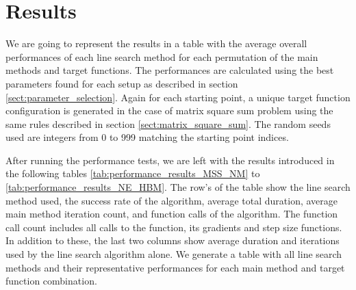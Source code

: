 \documentclass[a4paper,english,titlepage,12pt]{article}
\begin{document}




\section{Results}


We are going to represent the results in a table with the average overall performances of each line search method for each permutation of the main methods and target functions. The performances are calculated using the best parameters found for each setup as described in section \ref{sect:parameter_selection}. Again for each starting point, a unique target function configuration is generated in the case of matrix square sum problem using the same rules described in section \ref{sect:matrix_square_sum}. The random seeds used are integers from 0 to 999 matching the starting point indices.

After running the performance tests, we are left with the results introduced in the following tables \ref{tab:performance_results_MSS_NM} to \ref{tab:performance_results_NE_HBM}. The row's of the table show the line search method used, the success rate of the algorithm, average total duration, average main method iteration count, and function calls of the algorithm. The function call count includes all calls to the function, its gradients and step size functions. In addition to these, the last two columns show average duration and iterations used by the line search algorithm alone. We generate a table with all line search methods and their representative performances for each main method and target function combination.
\end{document}
